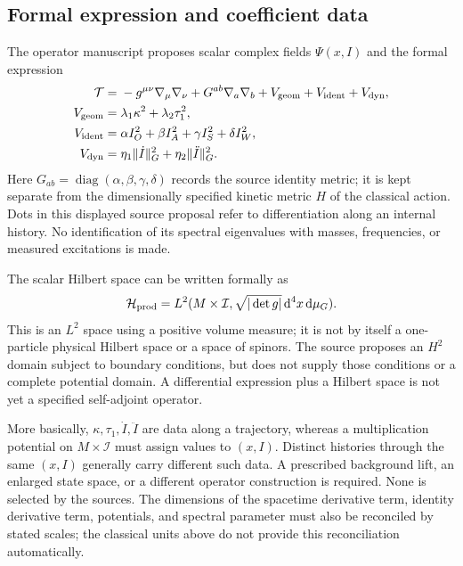 \documentclass[aip,jmp,reprint,onecolumn,amsmath,amssymb]{revtex4-2}
\newcommand{\dd}{\mathrm{d}}
\newcommand{\I}{\mathcal I}
\begin{document}
\subsection{Formal expression and coefficient data}
The operator manuscript proposes scalar complex fields $\Psi(x,I)$ and the formal expression\cite{unified}
\begin{align}
\mathcal T={}&-g^{\mu\nu}\nabla_\mu\nabla_\nu
             +G^{ab}\nabla_a\nabla_b
             +V_{\rm geom}+V_{\rm ident}+V_{\rm dyn},\label{eq:formalT}\\
V_{\rm geom}={}&\lambda_1\kappa^2+\lambda_2\tau_1^2,\\
V_{\rm ident}={}&\alpha I_O^2+\beta I_A^2+\gamma I_S^2+\delta I_W^2,\\
V_{\rm dyn}={}&\eta_1\|\dot I\|_G^2+\eta_2\|\ddot I\|_G^2.
\end{align}
Here $G_{ab}=\operatorname{diag}(\alpha,\beta,\gamma,\delta)$ records the source identity metric; it is kept separate from the dimensionally specified kinetic metric $H$ of the classical action. Dots in this displayed source proposal refer to differentiation along an internal history. No identification of its spectral eigenvalues with masses, frequencies, or measured excitations is made.

The scalar Hilbert space can be written formally as
\begin{equation}
\mathcal H_{\rm prod}=L^2(M\times\I,\sqrt{|\det g|}\,\dd^4x\,\dd\mu_G).
\end{equation}
This is an $L^2$ space using a positive volume measure; it is not by itself a one-particle physical Hilbert space or a space of spinors. The source proposes an $H^2$ domain subject to boundary conditions, but does not supply those conditions or a complete potential domain. A differential expression plus a Hilbert space is not yet a specified self-adjoint operator.

More basically, $\kappa,\tau_1,\dot I,\ddot I$ are data along a trajectory, whereas a multiplication potential on $M\times\I$ must assign values to $(x,I)$. Distinct histories through the same $(x,I)$ generally carry different such data. A prescribed background lift, an enlarged state space, or a different operator construction is required. None is selected by the sources. The dimensions of the spacetime derivative term, identity derivative term, potentials, and spectral parameter must also be reconciled by stated scales; the classical units above do not provide this reconciliation automatically.
\end{document}
